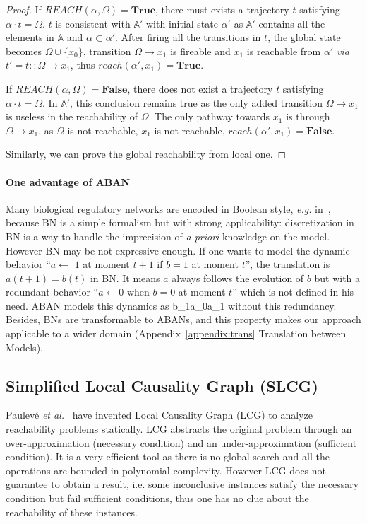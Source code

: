 \begin{proof}
If $REACH(\alpha,\Omega)=\mathbf{True}$, there must exists a trajectory $t$ satisfying $\alpha\cdot t=\Omega$.
$t$ is consistent with $\mathbb{A}'$ with initial state $\alpha'$ as $\mathbb{A}'$ contains all the elements in $\mathbb{A}$ and $\alpha\subset\alpha'$.
After firing all the transitions in $t$, the global state becomes $\Omega\cup\{x_0\}$, transition $\Omega\to x_1$ is fireable and $x_1$ is reachable from $\alpha'$ \textit{via} $t'=t::\Omega\to x_1$, thus $reach(\alpha', x_1)=\mathbf{True}$. 

If $REACH(\alpha,\Omega)=\mathbf{False}$, there does not exist a trajectory $t$ satisfying $\alpha\cdot t=\Omega$.
In $\mathbb{A}'$, this conclusion remains true as the only added transition $\Omega\to x_1$ is useless in the reachability of $\Omega$.
The only pathway towards $x_1$ is through $\Omega\to x_1$, as $\Omega$ is not reachable, $x_1$ is not reachable, $reach(\alpha', x_1)=\mathbf{False}$.

Similarly, we can prove the global reachability from local one.
\end{proof}

\paragraph{\textbf{One advantage of ABAN}}\label{par:advantage}
Many biological regulatory networks are encoded in Boolean style, \textit{e.g.} in~\cite{akutsu2007control,kauffman1969}, because BN is a simple formalism but with strong applicability: discretization in BN is a way to handle the imprecision of \textit{a priori} knowledge on the model.
However BN may be not expressive enough.
If one wants to model the dynamic behavior ``$a\gets$ $1$ at moment $t+1$ if $b=1$ at moment $t$'', the translation is $a(t+1)=b(t)$ in BN.
It means $a$ always follows the evolution of $b$ but with a redundant behavior ``$a\gets 0$ when $b=0$ at moment $t$'' which is not defined in his need.
ABAN models this dynamics as \ac{b_1}{a_0}{a_1} without this redundancy. 
Besides, BNs are transformable to ABANs, and this property makes our approach applicable to a wider domain (Appendix~\ref{appendix:trans} Translation between Models).

\subsection{Simplified Local Causality Graph (SLCG)}\label{sec:SLCG}
Paulev\'e \textit{et al.}~\cite{pauleve2011} have invented Local Causality Graph (LCG) to analyze reachability problems statically.
LCG abstracts the original problem through an over-approximation (necessary condition) and an under-approximation (sufficient condition).
It is a very efficient tool as there is no global search and all the operations are bounded in polynomial complexity.
However LCG does not guarantee to obtain a result, i.e. some inconclusive instances satisfy the necessary condition but fail sufficient conditions, thus one has no clue about the reachability of these instances.

